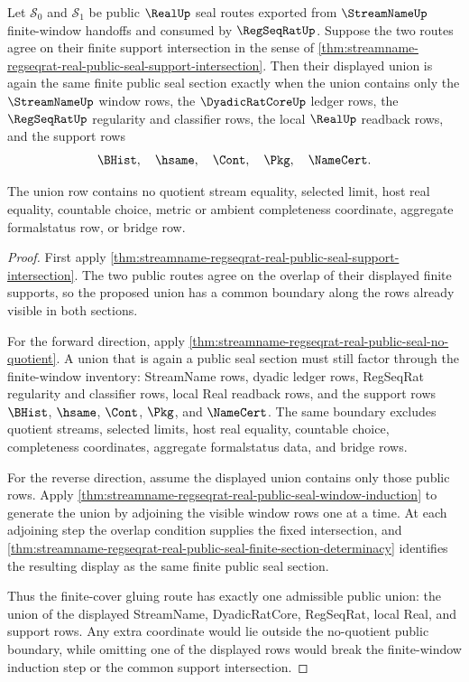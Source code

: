 \begin{theorem}
\label{thm:streamname-regseqrat-real-public-seal-support-union}
Let $\mathcal S_0$ and $\mathcal S_1$ be public $\RealUp$ seal routes exported
from $\StreamNameUp$ finite-window handoffs and consumed by $\RegSeqRatUp$.
Suppose the two routes agree on their finite support intersection in the sense
of
\autoref{thm:streamname-regseqrat-real-public-seal-support-intersection}.
Then their displayed union is again the same finite public seal section exactly
when the union contains only the $\StreamNameUp$ window rows, the
$\DyadicRatCoreUp$ ledger rows, the $\RegSeqRatUp$ regularity and classifier
rows, the local $\RealUp$ readback rows, and the support rows
$$
\BHist,\quad \hsame,\quad \Cont,\quad \Pkg,\quad \NameCert.
$$

The union row contains no quotient stream equality, selected limit, host real
equality, countable choice, metric or ambient completeness coordinate, aggregate
formalstatus row, or bridge row.
\end{theorem}
\begin{proof}
First apply
\autoref{thm:streamname-regseqrat-real-public-seal-support-intersection}. The
two public routes agree on the overlap of their displayed finite supports, so
the proposed union has a common boundary along the rows already visible in both
sections.

For the forward direction, apply
\autoref{thm:streamname-regseqrat-real-public-seal-no-quotient}. A union that is
again a public seal section must still factor through the finite-window
inventory: StreamName rows, dyadic ledger rows, RegSeqRat regularity and
classifier rows, local Real readback rows, and the support rows $\BHist$,
$\hsame$, $\Cont$, $\Pkg$, and $\NameCert$. The same boundary excludes quotient
streams, selected limits, host real equality, countable choice, completeness
coordinates, aggregate formalstatus data, and bridge rows.

For the reverse direction, assume the displayed union contains only those public
rows. Apply
\autoref{thm:streamname-regseqrat-real-public-seal-window-induction} to generate
the union by adjoining the visible window rows one at a time. At each adjoining
step the overlap condition supplies the fixed intersection, and
\autoref{thm:streamname-regseqrat-real-public-seal-finite-section-determinacy}
identifies the resulting display as the same finite public seal section.

Thus the finite-cover gluing route has exactly one admissible public union: the
union of the displayed StreamName, DyadicRatCore, RegSeqRat, local Real, and
support rows. Any extra coordinate would lie outside the no-quotient public
boundary, while omitting one of the displayed rows would break the finite-window
induction step or the common support intersection.
\end{proof}
